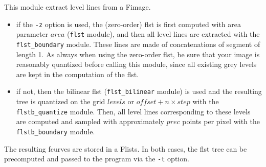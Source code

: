 This module extract level lines from a Fimage.

\begin{itemize}
\item if the \verb+-z+ option is used, the (zero-order) flst is first
computed with area parameter $area$ 
(\verb+flst+ module), and then all level lines are extracted
with the \verb+flst_boundary+ module.
These lines are made of concatenations of segment of length 1. 
As always when using the zero-order flst, be sure that your image is
reasonably quantized before calling this module, since all existing
grey levels are kept in the computation of the flst.
\item if not, then the bilinear flst (\verb+flst_bilinear+ module) is used 
and the resulting tree is quantized on the grid $levels$ or
$offset + n \times step$
with the \verb+flstb_quantize+ module. Then, all level lines corresponding
to these levels are computed and sampled with approximately $prec$ points
per pixel with the \verb+flstb_boundary+ module.
\end{itemize}

The resulting fcurves are stored in a Flists. In both cases, the flst tree
can be precomputed and passed to the program via the \verb+-t+ option.